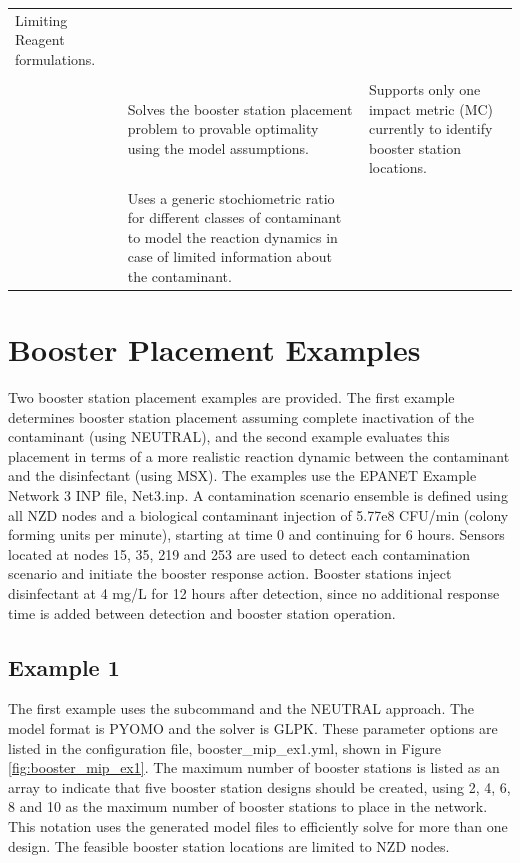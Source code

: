 \begin{center}
\begin{tabular}{ |l|p{5.5cm}|p{5.5cm}| }
                                     Limiting Reagent formulations.\\
                                     &&\\
                                     & Solves the booster station placement problem to provable optimality
									 using the model assumptions.
                                     & Supports only one impact metric (MC) currently to identify 
									 booster station locations. \\ 
                                     &&\\
                                     & Uses a generic stochiometric ratio for different classes of contaminant 
									 to model the reaction dynamics in case of limited information about
                                     the contaminant.  
                                     &\\
\hline
\end{tabular}
\end{center}

\section{Booster Placement Examples}\label{booster_example}
Two booster station placement examples are provided. The first example determines 
booster station placement assuming complete inactivation of the contaminant (using NEUTRAL), and the second 
example evaluates this placement in terms of a more realistic reaction dynamic between the 
contaminant and the disinfectant (using MSX). The examples use the EPANET Example Network 3 INP file, Net3.inp. 
A contamination scenario ensemble is defined using all NZD nodes and a biological contaminant  
injection of 5.77e8 CFU/min (colony forming units per minute), starting at time 0 and continuing for 6 hours.  
Sensors located at nodes 15, 35, 219 and 253 are used to detect each contamination scenario 
and initiate the booster response action. Booster stations inject disinfectant at 4 mg/L for 12 hours after 
detection, since no additional response time is added between detection and booster station operation.  

\subsection{Example 1}
The first example uses the  subcommand and the NEUTRAL approach. 
The model format is PYOMO and the solver is GLPK. These parameter options are 
listed in the configuration file, booster\_mip\_ex1.yml, shown in Figure \ref{fig:booster_mip_ex1}. 
The maximum number of booster stations is listed as an array to indicate that five booster station 
designs should be created, using 2, 4, 6, 8 and 10 as the maximum number of booster stations to place in the network. 
This notation uses the generated model files to efficiently solve for more than one design. 
The feasible booster station locations are limited to NZD nodes.

